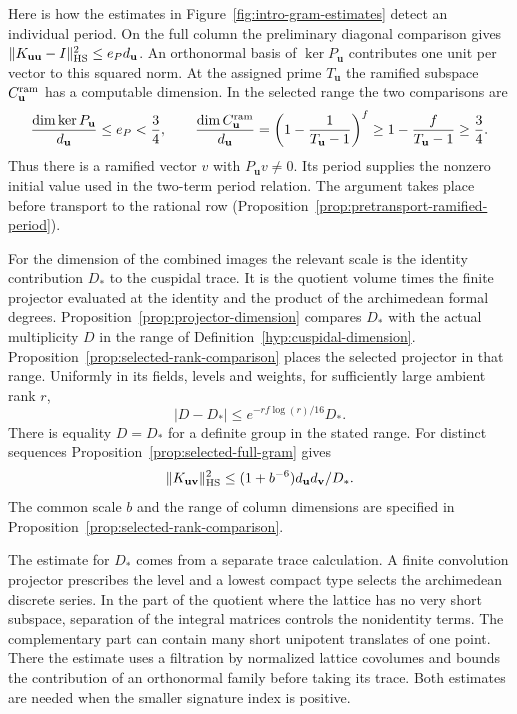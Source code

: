 Here is how the estimates in Figure~\ref{fig:intro-gram-estimates} detect an individual period. On the full column the preliminary diagonal comparison gives \(\|K_{\mathbf u\mathbf u}-I\|_{\rm HS}^2\le e_Pd_{\mathbf u}\). An orthonormal basis of \(\ker P_{\mathbf u}\) contributes one unit per vector to this squared norm. At the assigned prime \(T_{\mathbf u}\) the ramified subspace \(C_{\mathbf u}^{\rm ram}\) has a computable dimension. In the selected range the two comparisons are
\[
 \frac{\dim\ker P_{\mathbf u}}{d_{\mathbf u}}\le e_P<\frac34,
 \qquad
 \frac{\dim C_{\mathbf u}^{\rm ram}}{d_{\mathbf u}}
   =\left(1-\frac{1}{T_{\mathbf u}-1}\right)^f
   \ge 1-\frac{f}{T_{\mathbf u}-1}\ge\frac34 .
\]
Thus there is a ramified vector \(v\) with \(P_{\mathbf u}v\ne0\). Its period supplies the nonzero initial value used in the two-term period relation. The argument takes place before transport to the rational row (Proposition~\ref{prop:pretransport-ramified-period}).

For the dimension of the combined images the relevant scale is the identity contribution \(D_*\) to the cuspidal trace. It is the quotient volume times the finite projector evaluated at the identity and the product of the archimedean formal degrees. Proposition~\ref{prop:projector-dimension} compares \(D_*\) with the
actual multiplicity \(D\) in the range of Definition~\ref{hyp:cuspidal-dimension}.
Proposition~\ref{prop:selected-rank-comparison} places the selected
projector in that range. Uniformly in its fields, levels and weights,
for sufficiently large ambient rank \(r\),
\[
          |D-D_*|\le e^{-rf\log(r)/16}D_*.
\]
There is equality \(D=D_*\) for a definite group in the stated range. For distinct sequences Proposition~\ref{prop:selected-full-gram} gives
\[
 \|K_{\mathbf u\mathbf v}\|_{\rm HS}^2\le(1+b^{-6})d_{\mathbf u}d_{\mathbf v}/D_* .
\]
The common scale \(b\) and the range of column dimensions are specified in Proposition~\ref{prop:selected-rank-comparison}.

The estimate for \(D_*\) comes from a separate trace calculation. A finite convolution projector prescribes the level and a lowest compact type selects the archimedean discrete series. In the part of the quotient where the lattice has no very short subspace, separation of the integral matrices controls the nonidentity terms. The complementary part can contain many short unipotent translates of one point. There the estimate uses a filtration by normalized lattice covolumes and bounds the contribution of an orthonormal family before taking its trace. Both estimates are needed when the smaller signature index is positive.

